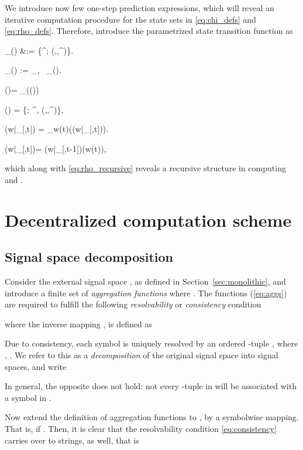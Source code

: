 \documentclass[a4paper, 10pt, conference]{ieeeconf}
\newcommand{\hspm}{\hspace{-2pt}}
\newcommand{\taut}{{_{[\tau,t]}}}
\begin{document}
We introduce now few one-step prediction expressions, which will reveal an iterative computation procedure for the state sets in \eqref{eq:chi_defs} and \eqref{eq:rho_defs}. Therefore, introduce the parametrized {state transition} function  as

\label{eq:rho_hat}
\hat\rho_\omega(\xi) &:=  \{\xi^\prime ; (\xi,\omega,\xi^\prime)\hspm\in\hspm\Delta\}.

\label{eq:rho_hat}
\hat\rho_\Omega(\Xi) :=  \cup_{\omega\in\Omega, \xi\in\Xi}~\hat\rho_\omega(\xi).

\label{eq:rho}
{\rho}(\omega)= \hat{\rho}_\omega({\chi(\omega)})

\label{eq:chi}
{\chi}(\omega) = \{\xi; \exists \xi^\prime, (\xi,\omega,\xi^\prime)\in\Delta\},

\label{eq:rho_recursive}
\rho(w|\taut) = \hat\rho_{w(t)}(\chi(w|\taut)).

\label{eq:chi_recursive}
\chi(w|_{[\tau,t]})=   \rho(w|_{[\tau,t-1]})\cap \chi(w({t})),

which along with \eqref{eq:rho_recursive} reveals a recursive structure in computing  and .








\section{Decentralized computation scheme}
\label{sec:distributed}


\subsection{Signal space decomposition}
\label{sec:abstraction}
Consider the external signal space , as defined in Section~\ref{sec:monolithic}, and introduce a finite set of \emph{aggregation functions}
where . The functions (\ref{eq:aggs}) are required to fulfill the following \emph{resolvability} or \emph{consistency} condition

where the inverse mapping , is defined as

Due to consistency, each symbol  is uniquely resolved by an ordered -tuple , where , . We refer to this as a \emph{decomposition} of the original signal space  into  signal spaces, and write

In general, the opposite does not hold: not every -tuple in  will be associated with a symbol in .


Now extend the definition of aggregation functions to , by a symbolwise mapping. That is,   if . Then, it is clear that the resolvability condition \eqref{eq:consistency} carries over to strings, as well, that is
\end{document}
